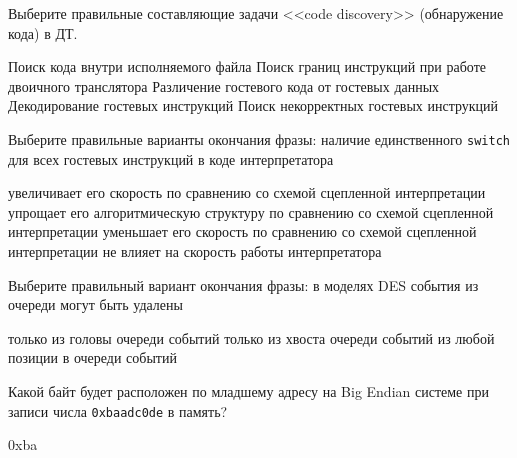 \documentclass[a4paper, addpoints]{exam}
\begin{document}
\begin{questions}
    
\question[1] Выберите правильные составляющие задачи <<code discovery>> (обнаружение кода) в ДТ.
\begin{choices}
     \choice Поиск кода внутри исполняемого файла
     \correctchoice Поиск границ инструкций при работе двоичного транслятора
     \correctchoice Различение гостевого кода от гостевых данных
     \choice     Декодирование гостевых инструкций
     \choice Поиск некорректных гостевых инструкций
\end{choices}

    
\question[1] Выберите правильные варианты окончания фразы: наличие единственного \texttt{switch} для всех гостевых инструкций в коде интерпретатора
\begin{choices}
    \choice увеличивает его скорость по сравнению со схемой сцепленной интерпретации
    \choice упрощает его алгоритмическую структуру по сравнению со схемой сцепленной интерпретации
    \correctchoice уменьшает его скорость по сравнению со схемой сцепленной интерпретации
    \choice не влияет на скорость работы интерпретатора
\end{choices}


\question[1] Выберите правильный вариант окончания фразы: в моделях DES события из очереди могут быть удалены
\begin{choices}
    \choice только из головы очереди событий
    \choice только из хвоста очереди событий
    \correctchoice из любой позиции в очереди событий
\end{choices}


\question[1] Какой байт будет расположен по младшему адресу на Big Endian системе при записи числа \texttt{0xbaadc0de} в память?
\begin{solution}[1cm]
0xba
\end{solution}



\end{questions}
\end{document}
